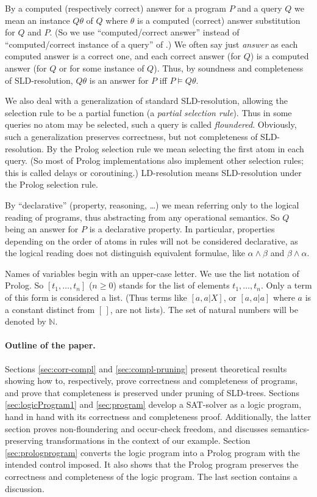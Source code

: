 \documentclass{tlp}
\newcommand*{\seq}[2][n]  {{#2_{1}, \allowbreak \ldots, \allowbreak #2_{#1}}}
\newcommand*{\NN}{{\ensuremath{\mathbb{N}}}\xspace}
\begin{document}
  By a computed (respectively correct) answer for a program $P$ and a
  query $Q$ we mean an instance $Q\theta$ of $Q$ where $\theta$ is a computed
  (correct) answer substitution \cite{Apt-Prolog} for $Q$ and $P$.
(So we use ``computed/correct answer'' instead of
 ``computed/correct instance of a query'' of \cite{Apt-Prolog}.)
  We often say just
   {\em answer}
as each computed answer is a correct one, 
and each correct answer (for $Q$) is a computed answer
(for $Q$ or for some instance of $Q$).
  Thus, by soundness and completeness of SLD-resolution,
  $Q\theta$ is an answer for $P$ iff $P\models Q\theta$.


We also deal with a generalization of standard 
SLD-resolution, allowing the selection rule to be a partial function
(a {\em partial selection rule}).
Thus in some queries no atom may be selected, 
such a query is called {\em floundered}.
Obviously, such a generalization preserves correctness, but not completeness of
SLD-resolution. 
By the Prolog selection rule we mean selecting the first atom in each query.
(So most of Prolog implementations also implement other selection rules; this
is called delays or coroutining.)
LD-resolution means SLD-resolution under the Prolog selection rule.


By ``declarative'' (property, reasoning, \ldots) 
we mean referring only to the logical reading of programs, 
thus abstracting from any operational semantics.
So $Q$ being an answer for $P$ is a declarative property.
In particular,
properties depending on the order of atoms in rules will not be considered
declarative, as the logical reading does not distinguish equivalent formulae,
like 
$\alpha\land\beta$ and $\beta\land\alpha$.


  Names of variables begin with an upper-case letter.
  We use the list notation of Prolog.  So 
  $[\seq t]$  ($n\geq0$) stands for the list of elements $\seq t$.
  Only a term of this form is considered a list.
(Thus terms like $[a,a|X]$, or  $[a,a|a]$ where $a$ is a constant distinct
  from $[\,]$, are not lists).
The set of natural numbers will be denoted by \NN.

\paragraph{Outline of the paper.}
Sections \ref{sec:corr-compl} and \ref{sec:compl-pruning}
present theoretical results showing how to, respectively, prove correctness
and completeness of programs, and prove that completeness is preserved under
pruning of SLD-trees.
Sections \ref{sec:logicProgram1} and
\ref{sec:program}
develop a SAT-solver as a logic program, hand in hand with its correctness
and completeness proof.
Additionally, the latter section proves non-floundering and occur-check
freedom, and discusses semantics-preserving transformations in the context
of our example.
Section \ref{sec:prologprogram}
converts the logic program into a Prolog program with the intended control
imposed.  It also shows that the Prolog program preserves the correctness and
completeness of the logic program.
The last section contains a discussion.
\end{document}
